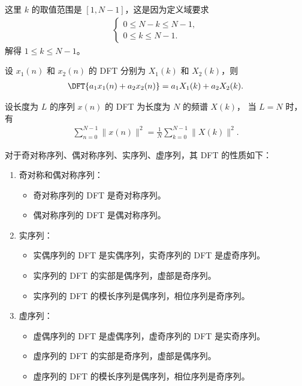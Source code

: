 \begin{note}
    这里 $k$ 的取值范围是 $[1, N-1]$，这是因为定义域要求
    \begin{align*}
        \begin{cases}
            0 \le N - k \le N - 1, \\
            0 \le k \le N - 1.
        \end{cases}
    \end{align*}
    解得 $1 \le k \le N - 1$。
\end{note}

\begin{property}
    设 $x_1(n)$ 和 $x_2(n)$ 的 DFT 分别为 $X_1(k)$ 和 $X_2(k)$，则
    \begin{align*}
        \DFT{a_1x_1(n) + a_2x_2(n)} = a_1X_1(k) + a_2X_2(k).
    \end{align*}
\end{property}

\begin{property}
    设长度为 $L$ 的序列 $x(n)$ 的 DFT 为长度为 $N$ 的频谱 $X(k)$，
    当 $L = N$ 时，有
    \begin{align*}
        \sum_{n = 0}^{N - 1}\|x(n)\|^2 = \frac{1}{N}\sum_{k = 0}^{N - 1}\|X(k)\|^2.
    \end{align*}
\end{property}

\begin{property}
    对于奇对称序列、偶对称序列、实序列、虚序列，其 DFT 的性质如下：
    \begin{enumerate}
        \item 奇对称和偶对称序列：
            \begin{itemize}
                \item 奇对称序列的 DFT 是奇对称序列。
                \item 偶对称序列的 DFT 是偶对称序列。
            \end{itemize}
        \item 实序列：
            \begin{itemize}
                \item 实偶序列的 DFT 是实偶序列，实奇序列的 DFT 是虚奇序列。
                \item 实序列的 DFT 的实部是偶序列，虚部是奇序列。
                \item 实序列的 DFT 的模长序列是偶序列，相位序列是奇序列。
            \end{itemize}
        \item 虚序列：
            \begin{itemize}
                \item 虚偶序列的 DFT 是虚偶序列，虚奇序列的 DFT 是实奇序列。
                \item 虚序列的 DFT 的实部是奇序列，虚部是偶序列。
                \item 虚序列的 DFT 的模长序列是偶序列，相位序列是奇序列。
            \end{itemize}
    \end{enumerate}
\end{property}


